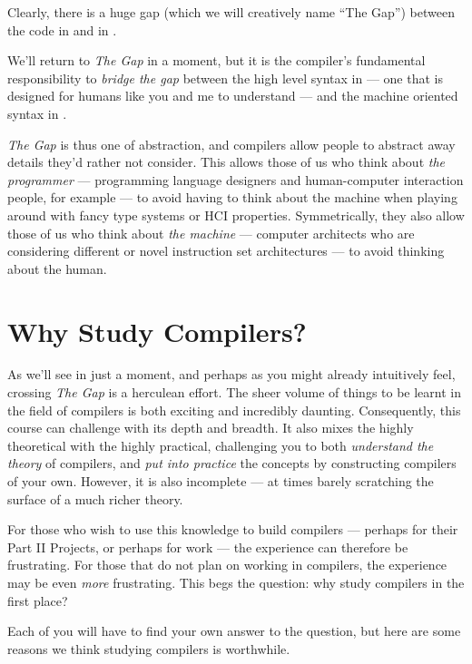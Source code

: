 Clearly, there is a huge gap (which we will creatively name ``The Gap'') between the code in  and in .

We'll return to \emph{The Gap} in a moment, but it is the compiler's fundamental responsibility to \emph{bridge the gap} between the high level syntax in  --- one that is designed for humans like you and me to understand --- and the machine oriented syntax in . 

\emph{The Gap} is thus one of abstraction, and compilers allow people to abstract away details they'd rather not consider. This allows those of us who think about \emph{the programmer} --- programming language designers and human-computer interaction people, for example --- to avoid having to think about the machine when playing around with fancy type systems or HCI properties. Symmetrically, they also allow those of us who think about \emph{the machine} --- computer architects who are considering different or novel instruction set architectures --- to avoid thinking about the human. 

\section{Why Study Compilers?}
As we'll see in just a moment, and perhaps as you might already intuitively feel, crossing \emph{The Gap} is a herculean effort. The sheer volume of things to be learnt in the field of compilers is both exciting and incredibly daunting. Consequently, this course can challenge with its depth and breadth. It also mixes the highly theoretical with the highly practical, challenging you to both \emph{understand the theory} of compilers, and \emph{put into practice} the concepts by constructing compilers of your own. However, it is also incomplete --- at times barely scratching the surface of a much richer theory.

For those who wish to use this knowledge to build compilers --- perhaps for their Part II Projects, or perhaps for work --- the experience can therefore be frustrating. For those that do not plan on working in compilers, the experience may be even \emph{more} frustrating. This begs the question: why study compilers in the first place?

Each of you will have to find your own answer to the question, but here are some reasons we think studying compilers is worthwhile. 

